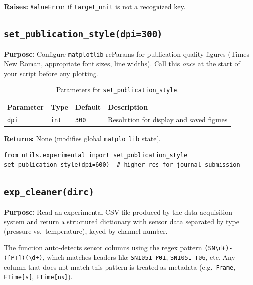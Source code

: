 \documentclass[11pt, letterpaper]{article}
\begin{document}
\textbf{Raises:} \texttt{ValueError} if \texttt{target\_unit} is not a
recognized key.

\subsection{\texttt{set\_publication\_style(dpi=300)}}
\label{subsec:set_pub_style}

\textbf{Purpose:} Configure \texttt{matplotlib} rcParams for
publication-quality figures (Times New Roman, appropriate font sizes,
line widths). Call this \emph{once} at the start of your script before
any plotting.

\begin{table}[h!]
\centering
\caption{Parameters for \texttt{set\_publication\_style}.}
\begin{tabular}{@{}llll@{}}
\toprule
\textbf{Parameter} & \textbf{Type} & \textbf{Default} & \textbf{Description} \\
\midrule
\texttt{dpi} & \texttt{int} & \texttt{300} & Resolution for display and saved figures \\
\bottomrule
\end{tabular}
\end{table}

\textbf{Returns:} None (modifies global \texttt{matplotlib} state).

\begin{lstlisting}[caption={Setting publication style.}]
from utils.experimental import set_publication_style
set_publication_style(dpi=600)  # higher res for journal submission
\end{lstlisting}

\subsection{\texttt{exp\_cleaner(dirc)}}
\label{subsec:exp_cleaner}

\textbf{Purpose:} Read an experimental CSV file produced by the data
acquisition system and return a structured dictionary with sensor data
separated by type (pressure vs.\ temperature), keyed by channel number.

The function auto-detects sensor columns using the regex pattern
\texttt{(SN\textbackslash d+)-([PT])(\textbackslash d+)}, which matches
headers like \texttt{SN1051-P01}, \texttt{SN1051-T06}, etc. Any column
that does not match this pattern is treated as metadata (e.g.\
\texttt{Frame}, \texttt{FTime[s]}, \texttt{FTime[ns]}).
\end{document}
